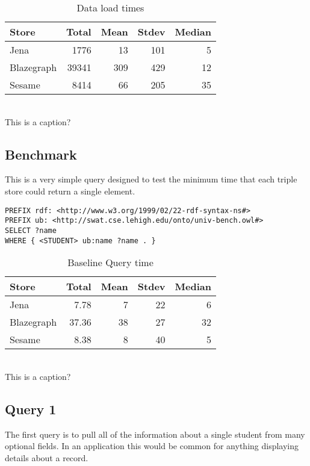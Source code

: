 \documentclass{llncs}
\begin{document}
\begin{table}
\begin{center}
\caption{Data load times}
\begin{tabular}{l | r r r r } Store & Total & Mean & Stdev & Median \\ \hline Jena & 1776 & 13 & 101 & 5 \\ Blazegraph & 39341 & 309 & 429 & 12 \\ Sesame & 8414 & 66 & 205 & 35 \end{tabular}
\\[5pt]
This is a caption?
\end{center}
\end{table}

\subsection{Benchmark}

This is a very simple query designed to test the minimum time that each triple store could return a single element.

\begin{lstlisting}
PREFIX rdf: <http://www.w3.org/1999/02/22-rdf-syntax-ns#>
PREFIX ub: <http://swat.cse.lehigh.edu/onto/univ-bench.owl#>
SELECT ?name
WHERE { <STUDENT> ub:name ?name . }
\end{lstlisting}

\smallskip

\begin{table}
\begin{center}
\caption{Baseline Query time}
\begin{tabular}{l | r r r r } Store & Total & Mean & Stdev & Median \\ \hline Jena & 7.78 & 7 & 22 & 6 \\ Blazegraph & 37.36 & 38 & 27 & 32 \\ Sesame & 8.38 & 8 & 40 & 5 \end{tabular}
\\[5pt]
This is a caption?
\end{center}
\end{table}

\subsection{Query 1}

The first query is to pull all of the information about a single student from many optional fields.  In an application this would be common for anything displaying details about a record.
\end{document}
